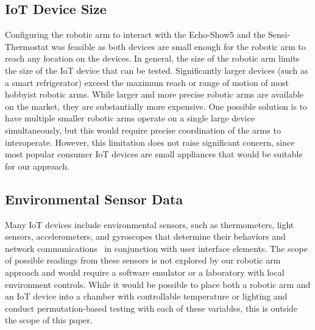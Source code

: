 \subsection{IoT Device Size}
Configuring the robotic arm to interact with the Echo-Show5 and the Sensi-Thermostat was feasible as both devices are small enough for the robotic arm to reach any location on the devices. In general, the size of the robotic arm limits the size of the IoT device that can be tested. Significantly larger devices (such as a smart refrigerator) exceed the maximum reach or range of motion of most hobbyist robotic arms. While larger and more precise robotic arms are available on the market, they are substantially more expensive. One possible solution is to have multiple smaller robotic arms operate on a single large device simultaneously, but this would require precise coordination of the arms to interoperate. However, this limitation does not raise significant concern, since most popular consumer IoT devices are small appliances that would be suitable for our approach.

\subsection{Environmental Sensor Data}
Many IoT devices include environmental sensors, such as thermometers, light sensors, accelerometers, and gyroscopes that determine their behaviors and network communications~\cite{apthorpe2019keeping} in conjunction with user interface elements.
The scope of possible readings from these sensors is not explored by our robotic arm approach and would require a software emulator or a laboratory with local environment controls. While it would be possible to place both a robotic arm and an IoT device into a chamber with controllable temperature or lighting and conduct permutation-based testing with each of these variables, this is outside the scope of this paper. 
